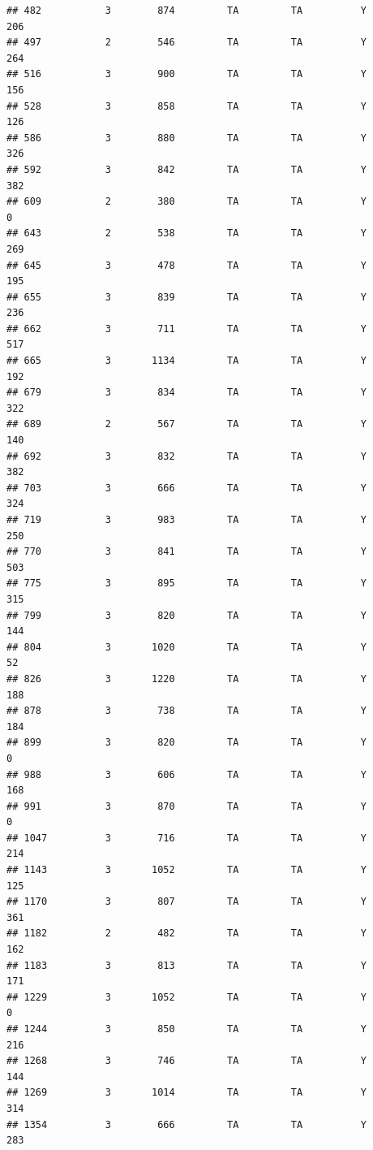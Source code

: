 \documentclass[]{article}
\begin{document}
\begin{verbatim}
## 482           3        874         TA         TA          Y        206
## 497           2        546         TA         TA          Y        264
## 516           3        900         TA         TA          Y        156
## 528           3        858         TA         TA          Y        126
## 586           3        880         TA         TA          Y        326
## 592           3        842         TA         TA          Y        382
## 609           2        380         TA         TA          Y          0
## 643           2        538         TA         TA          Y        269
## 645           3        478         TA         TA          Y        195
## 655           3        839         TA         TA          Y        236
## 662           3        711         TA         TA          Y        517
## 665           3       1134         TA         TA          Y        192
## 679           3        834         TA         TA          Y        322
## 689           2        567         TA         TA          Y        140
## 692           3        832         TA         TA          Y        382
## 703           3        666         TA         TA          Y        324
## 719           3        983         TA         TA          Y        250
## 770           3        841         TA         TA          Y        503
## 775           3        895         TA         TA          Y        315
## 799           3        820         TA         TA          Y        144
## 804           3       1020         TA         TA          Y         52
## 826           3       1220         TA         TA          Y        188
## 878           3        738         TA         TA          Y        184
## 899           3        820         TA         TA          Y          0
## 988           3        606         TA         TA          Y        168
## 991           3        870         TA         TA          Y          0
## 1047          3        716         TA         TA          Y        214
## 1143          3       1052         TA         TA          Y        125
## 1170          3        807         TA         TA          Y        361
## 1182          2        482         TA         TA          Y        162
## 1183          3        813         TA         TA          Y        171
## 1229          3       1052         TA         TA          Y          0
## 1244          3        850         TA         TA          Y        216
## 1268          3        746         TA         TA          Y        144
## 1269          3       1014         TA         TA          Y        314
## 1354          3        666         TA         TA          Y        283

\end{verbatim}
\end{document}
